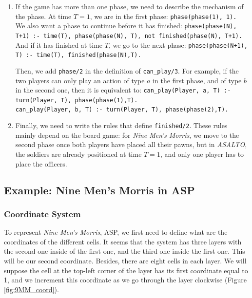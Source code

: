 \documentclass[12pt,twoside]{report}
\begin{document}
\begin{enumerate}
\item If the game has more than one phase, we need to describe the mechanism of the phase. At time $T=1$, we are in the first phase:\newline
\texttt{phase(phase(1), 1).}\\
We also want a phase to continue before it has finished:\newline
\texttt{phase(phase(N), T+1) :- time(T), phase(phase(N), T), not finished(phase(N), T+1).}\\
And if it has finished at time $T$, we go to the next phase:\newline
\texttt{phase(phase(N+1), T) :- time(T), finished(phase(N),T).}

\smallskip

Then, we add \texttt{phase/2} in the definition of \texttt{can\_play/3}. For example, if the two players can only play an action of type $a$ in the first phase, and of type $b$ in the second one, then it is equivalent to: \newline
\texttt{can\_play(Player, a, T) :- turn(Player, T), phase(phase(1),T).}\\
\texttt{can\_play(Player, b, T) :- turn(Player, T), phase(phase(2),T).}

\item Finally, we need to write the rules that define \texttt{finished/2}. These rules mainly depend on the board game: for \textit{Nine Men's Morris}, we move to the second phase once both players have placed all their pawns, but in \textit{ASALTO}, the soldiers are already positioned at time $T=1$, and only one player has to place the officers. 
\end{enumerate}

\subsection{Example: Nine Men's Morris in ASP}

\subsubsection{Coordinate System}

To represent \textit{Nine Men's Morris}, ASP, we first need to define what are the coordinates of the different cells. It seems that the system has three layers with the second one inside of the first one, and the third one inside the first one. This will be our second coordinate. Besides, there are eight cells in each layer. We will suppose the cell at the top-left corner of the layer has its first coordinate equal to 1, and we increment this coordinate as we go through the layer clockwise (Figure \ref{fig:9MM_coord}).
\end{document}
